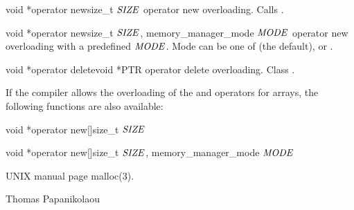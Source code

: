 \begin{fcode}{{void *}}{operator new}{size_t $\mathit{SIZE}$}
  operator new overloading. Calls .
\end{fcode}

\begin{fcode}{{void *}}{operator new}{size_t $\mathit{SIZE}$, memory_manager_mode $\mathit{MODE}$}
  operator new overloading with a predefined $\mathit{MODE}$. Mode can be one of  (the
  default),  or .
\end{fcode}

\begin{fcode}{{void *}}{operator delete}{void *PTR}
  operator delete overloading. Class .
\end{fcode}

If the compiler allows the overloading of the  and  operators for arrays,
the following functions are also available:

\begin{fcode}{{void *}}{operator new[]}{size_t $\mathit{SIZE}$}
\end{fcode}
\begin{fcode}{{void *}}{operator new[]}{size_t $\mathit{SIZE}$, memory_manager_mode $\mathit{MODE}$}
\end{fcode}



\SEEALSO
UNIX manual page malloc(3).



\AUTHOR
Thomas Papanikolaou
